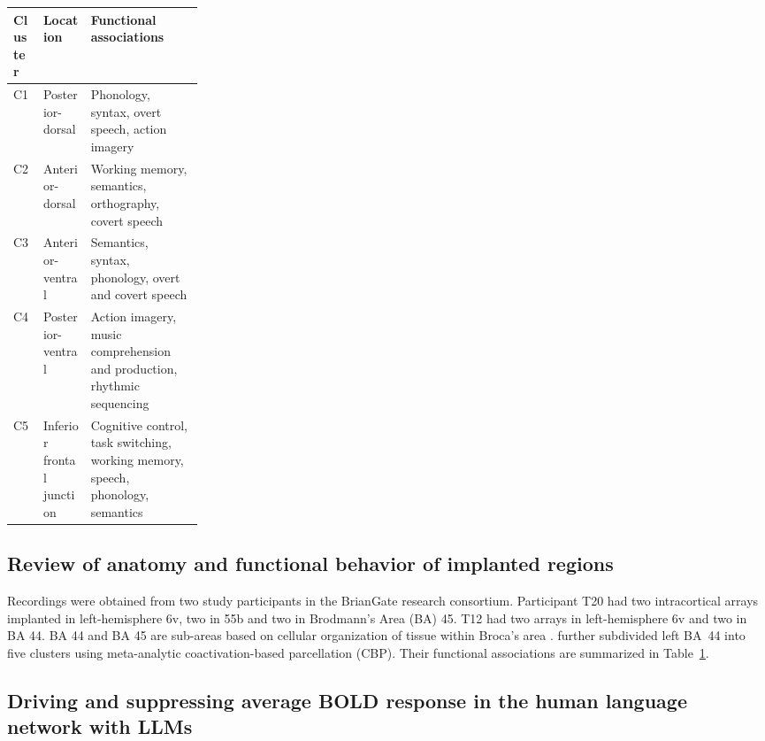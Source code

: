 \documentclass[11pt]{article}
\begin{document}
\begin{table}
    \centering
    \small
    \setlength{\tabcolsep}{3pt}
    \renewcommand{\arraystretch}{1.15}
    \vspace{-.4cm}
    \label{tab:ba44-clusters}
    \begin{tabularx}{\linewidth}{
        @{}l
        >{\raggedright\arraybackslash}p{0.25\linewidth}
        >{\raggedright\arraybackslash}X@{}
    }
        \toprule
        Cluster & Location & Functional associations \\
        \midrule
        C1 & Posterior-dorsal &
        Phonology, syntax, overt speech, action imagery \\
        C2 & Anterior-dorsal &
        Working memory, semantics, orthography, covert speech \\
        C3 & Anterior-ventral &
        Semantics, syntax, phonology, overt and covert speech \\
        C4 & Posterior-ventral &
        Action imagery, music comprehension and production,
        rhythmic sequencing \\
        C5 & Inferior frontal junction &
        Cognitive control, task switching, working memory,
        speech, phonology, semantics \\
        \bottomrule
    \end{tabularx}
\end{table}

\subsection{Review of anatomy and functional behavior of implanted regions}

Recordings were obtained from two study participants in the BrianGate research consortium. Participant T20 had two intracortical arrays implanted in left-hemisphere 6v, two in 55b and two in Brodmann's Area (BA) 45. T12 had two arrays in left-hemisphere 6v and two in BA 44. BA 44 and BA 45 are sub-areas based on cellular organization of tissue within Broca's area \cite{brodmann1909vergleichende}. \citet{clos2013tackling} further subdivided left BA~44 into five
clusters using meta-analytic coactivation-based parcellation (CBP).
Their functional associations are summarized in
Table~\ref{tab:ba44-clusters}.

\subsection{Driving and suppressing average BOLD response in the human language network  with LLMs}
\end{document}
